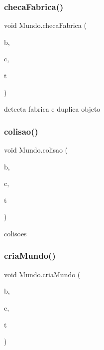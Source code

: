 \subsubsection{\texorpdfstring{checa\+Fabrica()}{checaFabrica()}}
{\footnotesize\ttfamily void Mundo.\+checa\+Fabrica (\begin{DoxyParamCaption}\item[{Array\+List$<$ \mbox{\hyperlink{class_moto}{Moto}} $>$}]{b,  }\item[{Array\+List$<$ \mbox{\hyperlink{class_carro}{Carro}} $>$}]{c,  }\item[{Array\+List$<$ \mbox{\hyperlink{class_caminhao}{Caminhao}} $>$}]{t }\end{DoxyParamCaption})}



detecta fabrica e duplica objeto 

\mbox{\label{class_mundo_a7a5e6f53aa4ecce473987615c08e3207}} 
\subsubsection{\texorpdfstring{colisao()}{colisao()}}
{\footnotesize\ttfamily void Mundo.\+colisao (\begin{DoxyParamCaption}\item[{Array\+List$<$ \mbox{\hyperlink{class_moto}{Moto}} $>$}]{b,  }\item[{Array\+List$<$ \mbox{\hyperlink{class_carro}{Carro}} $>$}]{c,  }\item[{Array\+List$<$ \mbox{\hyperlink{class_caminhao}{Caminhao}} $>$}]{t }\end{DoxyParamCaption})}



colisoes 

\mbox{\label{class_mundo_af3c85a96da0920ffc66893bf8cc4d055}} 
\subsubsection{\texorpdfstring{cria\+Mundo()}{criaMundo()}}
{\footnotesize\ttfamily void Mundo.\+cria\+Mundo (\begin{DoxyParamCaption}\item[{Array\+List$<$ \mbox{\hyperlink{class_moto}{Moto}} $>$}]{b,  }\item[{Array\+List$<$ \mbox{\hyperlink{class_carro}{Carro}} $>$}]{c,  }\item[{Array\+List$<$ \mbox{\hyperlink{class_caminhao}{Caminhao}} $>$}]{t }\end{DoxyParamCaption})}

